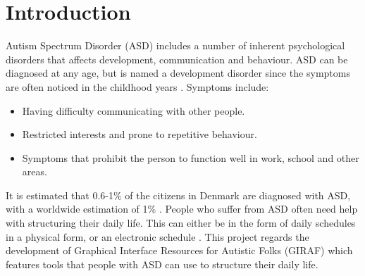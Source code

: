 \chapter{Introduction}

Autism Spectrum Disorder (ASD) includes a number of inherent psychological disorders that affects development, communication and behaviour. ASD can be diagnosed at any age, but is named a development disorder since the symptoms are often noticed in the childhood years \citep{cite:NIMH}. Symptoms include:

\begin{itemize}
    \item Having difficulty communicating with other people.
    \item Restricted interests and prone to repetitive behaviour.
    \item Symptoms that prohibit the person to function well in work, school and other areas.
\end{itemize} \citep{cite:NIMH}

It is estimated that 0.6-1\% of the citizens in Denmark are diagnosed with ASD, with a worldwide estimation of 1\% \citep{cite:SundedDK} \citep{cite:AutismSociety}.
People who suffer from ASD often need help with structuring their daily life. This can either be in the form of daily schedules in a physical form, or an electronic schedule \citep{cite:NIMH}. 
This project regards the development of Graphical Interface Resources for Autistic Folks (GIRAF) which features tools that people with ASD can use to structure their daily life.
